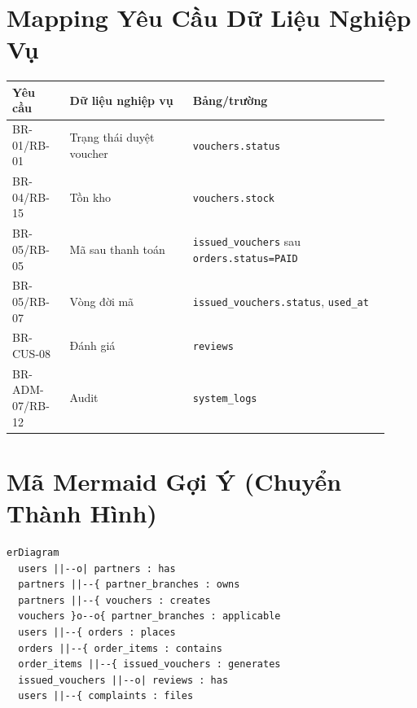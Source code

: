 \section{Mapping Yêu Cầu Dữ Liệu Nghiệp Vụ}
\begin{longtable}{>{\raggedright\arraybackslash}p{0.14\linewidth}>{\raggedright\arraybackslash}p{0.30\linewidth}>{\raggedright\arraybackslash}p{0.48\linewidth}}
\toprule
\textbf{Yêu cầu} & \textbf{Dữ liệu nghiệp vụ} & \textbf{Bảng/trường}\\
\midrule
BR-01/RB-01 & Trạng thái duyệt voucher & \texttt{vouchers.status}\\
BR-04/RB-15 & Tồn kho & \texttt{vouchers.stock}\\
BR-05/RB-05 & Mã sau thanh toán & \texttt{issued\_vouchers} sau \texttt{orders.status=PAID}\\
BR-05/RB-07 & Vòng đời mã & \texttt{issued\_vouchers.status}, \texttt{used\_at}\\
BR-CUS-08 & Đánh giá & \texttt{reviews}\\
BR-ADM-07/RB-12 & Audit & \texttt{system\_logs}\\
\bottomrule
\end{longtable}

\section{Mã Mermaid Gợi Ý (Chuyển Thành Hình)}
\begin{verbatim}
erDiagram
  users ||--o| partners : has
  partners ||--{ partner_branches : owns
  partners ||--{ vouchers : creates
  vouchers }o--o{ partner_branches : applicable
  users ||--{ orders : places
  orders ||--{ order_items : contains
  order_items ||--{ issued_vouchers : generates
  issued_vouchers ||--o| reviews : has
  users ||--{ complaints : files
\end{verbatim}
